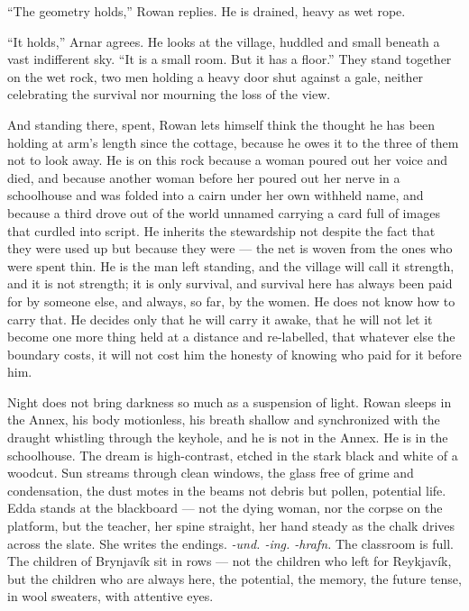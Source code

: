 \documentclass[11pt,oneside]{book}
\newcommand{\sceneline}{%
  \par\vspace{1.2em}
  \begin{center}
    \fontsize{11}{11}\selectfont \textbullet\quad\textbullet\quad\textbullet
  \end{center}
  \vspace{0.6em}\noindent\ignorespaces
}
\begin{document}
``The geometry holds,'' Rowan replies. He is drained, heavy as wet rope.

``It holds,'' Arnar agrees. He looks at the village, huddled and small
beneath a vast indifferent sky. ``It is a small room. But it has a
floor.'' They stand together on the wet rock, two men holding a heavy
door shut against a gale, neither celebrating the survival nor mourning
the loss of the view.

And standing there, spent, Rowan lets himself think the thought he has
been holding at arm's length since the cottage, because he owes it to
the three of them not to look away. He is on this rock because a woman
poured out her voice and died, and because another woman before her
poured out her nerve in a schoolhouse and was folded into a cairn under
her own withheld name, and because a third drove out of the world
unnamed carrying a card full of images that curdled into script. He
inherits the stewardship not despite the fact that they were used up but
because they were --- the net is woven from the ones who were spent
thin. He is the man left standing, and the village will call it
strength, and it is not strength; it is only survival, and survival here
has always been paid for by someone else, and always, so far, by the
women. He does not know how to carry that. He decides only that he will
carry it awake, that he will not let it become one more thing held at a
distance and re-labelled, that whatever else the boundary costs, it will
not cost him the honesty of knowing who paid for it before him.

\sceneline

Night does not bring darkness so much as a suspension of light. Rowan
sleeps in the Annex, his body motionless, his breath shallow and
synchronized with the draught whistling through the keyhole, and he is
not in the Annex. He is in the schoolhouse. The dream is high-contrast,
etched in the stark black and white of a woodcut. Sun streams through
clean windows, the glass free of grime and condensation, the dust motes
in the beams not debris but pollen, potential life. Edda stands at the
blackboard --- not the dying woman, nor the corpse on the platform, but
the teacher, her spine straight, her hand steady as the chalk drives
across the slate. She writes the endings. \emph{-und. -ing. -hrafn.} The
classroom is full. The children of Brynjavík sit in rows --- not the
children who left for Reykjavík, but the children who are always here,
the potential, the memory, the future tense, in wool sweaters, with
attentive eyes.
\end{document}
